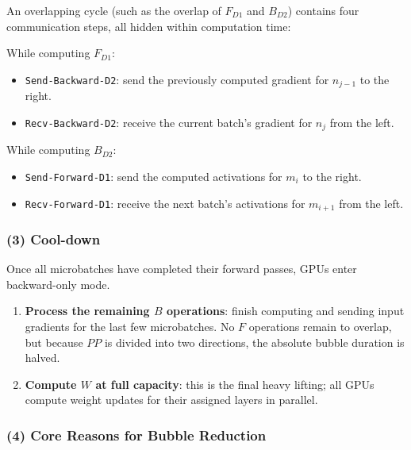 An overlapping cycle (such as the overlap of \(F_{D1}\) and \(B_{D2}\)) contains four communication steps, all hidden within computation time:

While computing \(F_{D1}\):

\begin{itemize}
\item
  \texttt{Send-Backward-D2}: send the previously computed gradient for \(n_{j-1}\) to the right.
\item
  \texttt{Recv-Backward-D2}: receive the current batch's gradient for \(n_j\) from the left.
\end{itemize}

While computing \(B_{D2}\):

\begin{itemize}
\item
  \texttt{Send-Forward-D1}: send the computed activations for \(m_i\) to the right.
\item
  \texttt{Recv-Forward-D1}: receive the next batch's activations for \(m_{i+1}\) from the left.
\end{itemize}

\hypertarget{cool-down}{%
\subsubsection{(3) Cool-down}\label{cool-down}}

Once all microbatches have completed their forward passes, GPUs enter backward-only mode.

\begin{enumerate}
\def\labelenumi{\arabic{enumi}.}
\tightlist
\item
  \textbf{Process the remaining \(B\) operations}: finish computing and sending input gradients for the last few microbatches. No \(F\) operations remain to overlap, but because \(PP\) is divided into two directions, the absolute bubble duration is halved.
\item
  \textbf{Compute \(W\) at full capacity}: this is the final heavy lifting; all GPUs compute weight updates for their assigned layers in parallel.
\end{enumerate}

\hypertarget{core-reasons-for-bubble-reduction}{%
\subsubsection{(4) Core Reasons for Bubble Reduction}\label{core-reasons-for-bubble-reduction}}

